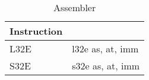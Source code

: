 \begin{longtable}{|p{5cm}|p{5cm}|}
	\caption{Assembler\label{long}}\\		
	\hline
	Instruction & \\
	\hline
	L32E & l32e as, at, imm\\ \hline
	S32E & s32e as, at, imm\\ \hline
\end{longtable}